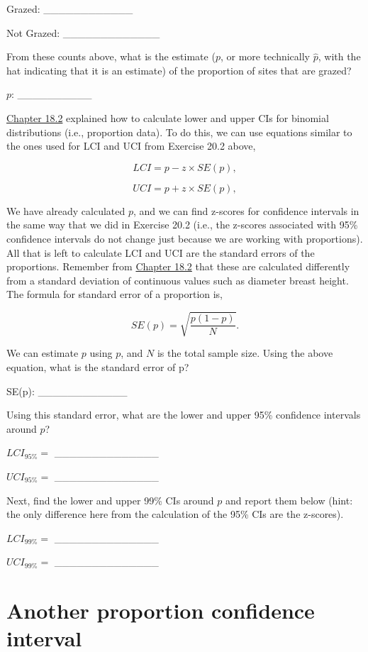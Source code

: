 \documentclass[
]{scrbook}
\begin{document}
Grazed: \_\_\_\_\_\_\_\_\_\_\_\_

Not Grazed: \_\_\_\_\_\_\_\_\_\_\_\_\_

From these counts above, what is the estimate (\(p\), or more technically \(\hat{p}\), with the hat indicating that it is an estimate) of the proportion of sites that are grazed?

\(p\): \_\_\_\_\_\_\_\_\_\_

\href{Chapter_18.html\#binomial-distribution-cis}{Chapter 18.2} explained how to calculate lower and upper CIs for binomial distributions (i.e., proportion data).
To do this, we can use equations similar to the ones used for LCI and UCI from Exercise 20.2 above,

\[LCI = p - z \times SE(p),\]

\[UCI = p + z \times SE(p),\]

We have already calculated \(p\), and we can find z-scores for confidence intervals in the same way that we did in Exercise 20.2 (i.e., the z-scores associated with 95\% confidence intervals do not change just because we are working with proportions).
All that is left to calculate LCI and UCI are the standard errors of the proportions.
Remember from \href{Chapter_18.html\#binomial-distribution-cis}{Chapter 18.2} that these are calculated differently from a standard deviation of continuous values such as diameter breast height.
The formula for standard error of a proportion is,

\[SE(p) = \sqrt{\frac{p\left(1 - p\right)}{N}}.\]

We can estimate \(p\) using \(p\), and \(N\) is the total sample size.
Using the above equation, what is the standard error of p?

SE(p): \_\_\_\_\_\_\_\_\_\_\_\_

Using this standard error, what are the lower and upper 95\% confidence intervals around \(p\)?

\(LCI_{95\%} =\) \_\_\_\_\_\_\_\_\_\_\_\_\_\_

\(UCI_{95\%} =\) \_\_\_\_\_\_\_\_\_\_\_\_\_\_

Next, find the lower and upper 99\% CIs around \(p\) and report them below (hint: the only difference here from the calculation of the 95\% CIs are the z-scores).

\(LCI_{99\%} =\) \_\_\_\_\_\_\_\_\_\_\_\_\_\_

\(UCI_{99\%} =\) \_\_\_\_\_\_\_\_\_\_\_\_\_\_

\hypertarget{another-proportion-confidence-interval}{%
\section{Another proportion confidence interval}\label{another-proportion-confidence-interval}}
\end{document}
